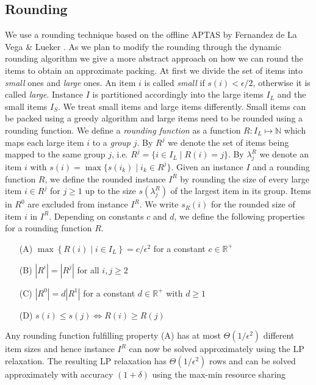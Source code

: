 \documentclass[a4paper,11pt]{article}
\newcommand{\menge}[1]{\left\{#1\right\}}
\begin{document}
\subsection{Rounding}
We use a rounding technique based on the offline APTAS by Fernandez de La Vega \&
Lueker \cite{de1981bin}. As we plan to modify the rounding through the dynamic rounding algorithm we give a 
more abstract approach on how we can
round the items to obtain an approximate packing.
At first we divide the set of items into \emph{small} ones and
\emph{large} ones. An item $i$ is called \emph{small} if $s(i) <
\epsilon/2$, otherwise it is called \emph{large}. Instance $I$ is partitioned accordingly
into the large items $I_{L}$ and the small items $I_{S}$.
We treat small items and large items differently. Small items can be packed using a greedy algorithm
and large items need to be rounded using a rounding function.
We define a \emph{rounding function} as a function $R: I_L \mapsto \mathbb{N}$ which maps each large item $i$
to a \emph{group} $j$. By $R^j$ we denote the set of items being mapped to the same 
group $j$, i.e.
$R^j = \{i \in I_L \mid R(i)=j \}$. By $\lambda_{j}^R$ we denote an item $i$ with 
$s(i) = \max \{s(i_k) \mid i_k \in R^j\}$.
Given an instance $I$ and a rounding function $R$, we define the rounded instance $I^R$ by rounding the size of 
every large item $i \in R^j$ for $j \geq 1$ up to the size $s(\lambda_{j}^R)$ of the largest item in its group. 
Items in $R^0$ are
excluded from instance $I^R$. We write $s_R (i)$ for the rounded size of item $i$ in $I^R$.
Depending on constants $c$ and $d$, we define the following properties for a rounding function $R$.
\begin{itemize}
\item[(A)] $\max\menge{R(i) \mid i \in I_L} = c/\epsilon^{2}$ for a constant $c \in \mathbb{R}^+$
\item[(B)] $|R^i| = |R^j|$ for all $i,j \geq 2$
\item[(C)] $|R^0| = d |R^1|$ for a constant $d \in \mathbb{R}^+$ with $d \geq 1$
\item[(D)] $s(i)\leq s(j)\Leftrightarrow R(i)\geq R(j)$ 
\end{itemize}
Any rounding function fulfilling property (A) has at most $\Theta(1/ \epsilon^2)$ different item sizes and hence 
instance
$I^R$ can now be solved approximately using the LP relaxation. The resulting LP relaxation has $\Theta(1/ \epsilon^2)$ 
rows
and can be solved approximately with accuracy $(1+ \delta)$ using the max-min resource sharing \cite{grigoriadis2001approximate}
\end{document}
